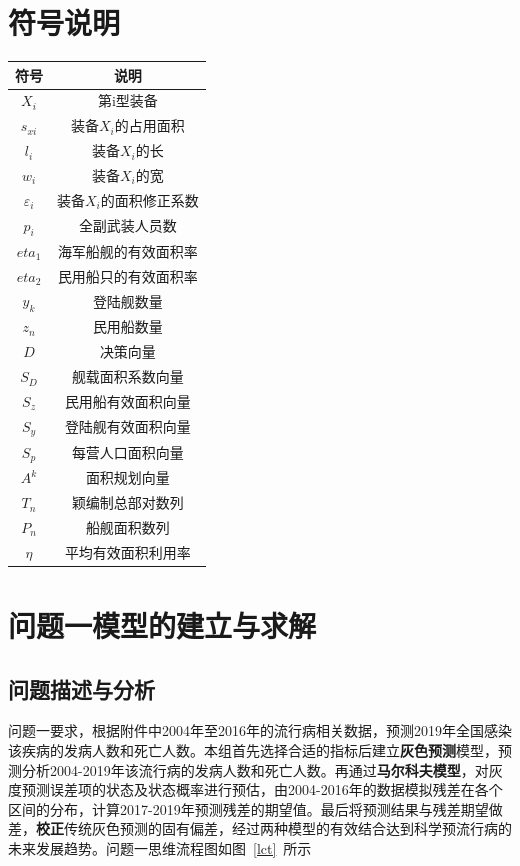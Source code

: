 \documentclass{whutmod}
\begin{document}
	
	\section{符号说明}
	\begin{table}[H]
	\label{biao} \centering

	\begin{tabular}{cc}
		\toprule[1.5pt]
		\multicolumn{1}{m{5cm}}{\centering 符号} & \multicolumn{1}{m{5cm}}{\centering 说明} \\
		\midrule[1pt]		
		$X_{i}$  &  第i型装备 \\ 
		$s_{xi}$  &  装备$X_{i}$的占用面积 \\ 
		$l_{i}$  & 装备$X_{i}$的长\\
		$w_{i}$  &  装备$X_{i}$的宽 \\ 
		$\varepsilon _{i}$ & 装备$X_{i}$的面积修正系数\\
		$p_{i}$	 &  全副武装人员数  \\ 
		$eta_{1}$ &  海军船舰的有效面积率 \\ 
		$eta_{2}$	 &  民用船只的有效面积率 \\ 
		$y_{k}$  &   登陆舰数量\\ 
		$z_{n}$  &  民用船数量\\	
		$D$ & 决策向量\\
		$S_{D}$ &  舰载面积系数向量\\ 
		$S_{z}$ & 民用船有效面积向量\\
		$S_{y}$ & 登陆舰有效面积向量\\
		$S_{p}$ & 每营人口面积向量\\
		$A^{k}$  & 面积规划向量\\
		$T_{n}$ & 颖编制总部对数列\\
		$P_{n}$ & 船舰面积数列\\
		$\eta $ &  平均有效面积利用率\\

		\bottomrule[1.5pt]
	\end{tabular}
\end{table}

	\section{问题一模型的建立与求解}
    \subsection{问题描述与分析}

    问题一要求，根据附件中2004年至2016年的流行病相关数据，预测2019年全国感染该疾病的发病人数和死亡人数。本组首先选择合适的指标后建立\textbf{灰色预测}模型，预测分析2004-2019年该流行病的发病人数和死亡人数。再通过\textbf{马尔科夫模型}，对灰度预测误差项的状态及状态概率进行预估，由2004-2016年的数据模拟残差在各个区间的分布，计算2017-2019年预测残差的期望值。最后将预测结果与残差期望做差，\textbf{校正}传统灰色预测的固有偏差，经过两种模型的有效结合达到科学预流行病的未来发展趋势。问题一思维流程图如图~\ref{lct}~所示
    
\end{document}
